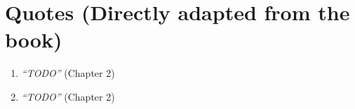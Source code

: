 \section*{Quotes (Directly adapted from the book)}
\begin{enumerate}
    \item \emph{``TODO''} (Chapter 2)
    \item \emph{``TODO''} (Chapter 2)
\end{enumerate}